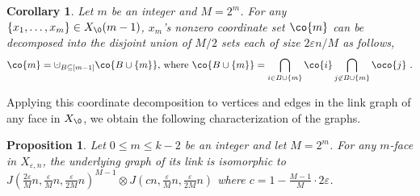 \documentclass[10pt,a4paper]{article}
\newtheorem{proposition}[theorem]{Proposition}
\newtheorem{corollary}[theorem]{Corollary}
\theoremstyle{definition}
\theoremstyle{remark}
\newcommand{\card}[1]{\lvert#1\rvert}
\renewcommand{\leq}{\leqslant}
\numberwithin{equation}{section}
\newcommand{\dunion}{\mathbin{\mathaccent\cdot\cup}}
\begin{document}
\begin{corollary} \label{cor:face-decomposition} Let $m$ be an integer and $M = 2^m$.
For any $\{x_1,\dots,x_{m}\}\in X_\0(m-1)$, $x_m$'s nonzero coordinate set $\co{m}$ can be decomposed into the disjoint union of $M/2$ sets each of size $2\varepsilon n/M$ as follows,
\[\co{m} =  \dunion_{B\subseteq [m-1]} \co{B\cup\{m\}} \text{, where }  \co{B\cup\{m\}} = \bigcap_{i\in B\cup\{m\}} \co{i}  \bigcap_{j\not\in B\cup\{m\}} \oco{j}  ~.\]
\end{corollary}

Applying this coordinate decomposition to vertices and edges in the link graph of any face in $X_\0$, we obtain the following characterization of the graphs.
\begin{proposition} \label{prop:link-structure}
    Let \(0 \leq m \leq k-2\) be an integer and let \(M=2^m\). For any $m$-face in $X_{\varepsilon, n}$, the underlying graph of its link is isomorphic to
    \(J(\frac{2\varepsilon}{M}n,\frac{\varepsilon}{M}n,\frac{\varepsilon}{2M}n)^{M-1} \otimes J(cn,\frac{\varepsilon}{M}n,\frac{\varepsilon}{2M}n)\) where
    \(c = 1- \frac{M-1}{M}\cdot 2\varepsilon\).
\end{proposition}
\end{document}
